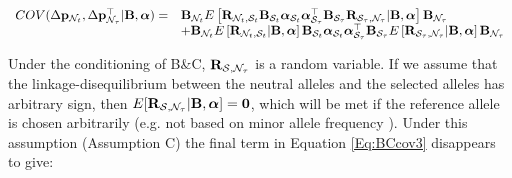 \documentclass[12pt]{article}
\begin{document}
\begin{bibunit}
\begin{footnotesize}
\begin{equation}
\begin{array}{rl}
COV(\Delta {\bf p}_{{\mathcal N}_t}, \Delta {\bf p}_{{\mathcal N}_{\tau}}^\top  | {\bf B}, \boldsymbol{\alpha}) 
=& {\bf B}_{{\mathcal N}_t}E\left[{\bf R}_{{\mathcal N}_t, {\mathcal S}_t}{\bf B}_{{\mathcal S}_t}\boldsymbol{\alpha}_{{\mathcal S}_t}\boldsymbol{\alpha}_{{\mathcal S}_{\tau}}^{\top}{\bf B}_{{\mathcal S}_{\tau}}{\bf R}_{{\mathcal S}_\tau, {\mathcal N}_{\tau}} | {\bf B}, \boldsymbol{\alpha}\right]{\bf B}_{{\mathcal N}_{\tau}}\\
&+{\bf B}_{{\mathcal N}_t}E\left[{\bf R}_{{\mathcal N}_t, {\mathcal S}_t} | {\bf B}, \boldsymbol{\alpha}\right]{\bf B}_{{\mathcal S}_t}\boldsymbol{\alpha}_{{\mathcal S}_t}\boldsymbol{\alpha}_{{\mathcal S}_{\tau}}^{\top}{\bf B}_{{\mathcal S}_{\tau}}E\left[{\bf R}_{{\mathcal S}_\tau, {\mathcal N}_{\tau}} | {\bf B}, \boldsymbol{\alpha}\right]{\bf B}_{{\mathcal N}_{\tau}}\\ 
\end{array}
\label{Eq:BCcov3}
\end{equation}
\end{footnotesize}
Under the conditioning of B\&C, ${\bf R}_{{\mathcal S}, {\mathcal N}_\tau}$ is a random variable. If we assume that the linkage-disequilibrium between the neutral alleles and the selected alleles has arbitrary sign, then $E[{\bf R}_{{\mathcal S}, {\mathcal N}_\tau} |  {\bf B}, \boldsymbol{\alpha}]={\bf 0}$, which will be met if the reference allele is chosen arbitrarily (e.g. not based on minor allele frequency \citep{good2022linkage}). Under this assumption (Assumption C) the final term in Equation \ref{Eq:BCcov3} disappears to give: 


\end{bibunit}
\end{document}
